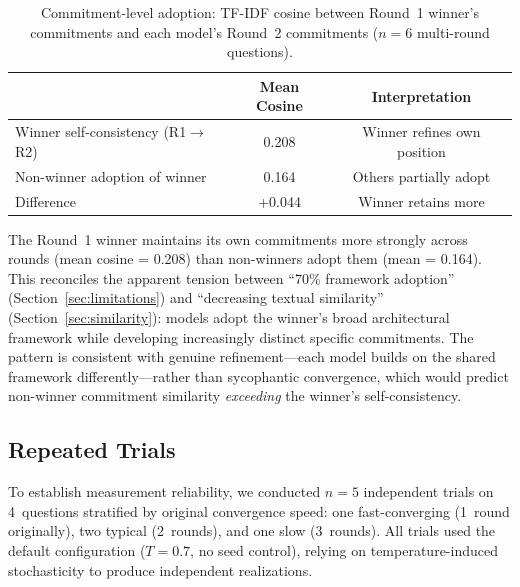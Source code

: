\documentclass[11pt,a4paper]{article}
\begin{document}
\begin{table}[ht]
\centering
\caption{Commitment-level adoption: TF-IDF cosine between Round~1 winner's commitments and each model's Round~2 commitments ($n = 6$ multi-round questions).}
\label{tab:commitment}
\begin{tabular}{@{}lcc@{}}
\toprule
 & \textbf{Mean Cosine} & \textbf{Interpretation} \\
\midrule
Winner self-consistency (R1$\to$R2) & 0.208 & Winner refines own position \\
Non-winner adoption of winner & 0.164 & Others partially adopt \\
\midrule
Difference & +0.044 & Winner retains more \\
\bottomrule
\end{tabular}
\end{table}

The Round~1 winner maintains its own commitments more strongly across rounds (mean cosine = 0.208) than non-winners adopt them (mean = 0.164). This reconciles the apparent tension between ``70\% framework adoption'' (Section~\ref{sec:limitations}) and ``decreasing textual similarity'' (Section~\ref{sec:similarity}): models adopt the winner's broad architectural framework while developing increasingly distinct specific commitments. The pattern is consistent with genuine refinement---each model builds on the shared framework differently---rather than sycophantic convergence, which would predict non-winner commitment similarity \emph{exceeding} the winner's self-consistency.

\subsection{Repeated Trials}
\label{sec:repeated_trials}

To establish measurement reliability, we conducted $n = 5$ independent trials on 4~questions stratified by original convergence speed: one fast-converging (1~round originally), two typical (2~rounds), and one slow (3~rounds). All trials used the default configuration ($T = 0.7$, no seed control), relying on temperature-induced stochasticity to produce independent realizations.
\end{document}
